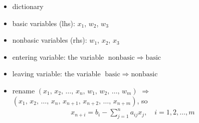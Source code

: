 \documentclass[usenames,dvipsnames,8pt]{beamer}%
\begin{document}
\begin{frame}
\begin{columns}
\begin{column}{0.5\textwidth}
\begin{itemize}
        \item dictionary
        \item basic variables (lhs): $x_1$, $w_2$, $w_3$ 
        \item nonbasic variables (rhs): $w_1$, $x_2$, $x_3$
        \item entering variable: the variable $\text{nonbasic}\;\Longrightarrow\;\text{basic}$
        \item leaving variable: the variable $\text{basic}\;\Longrightarrow\;\text{nonbasic}$
        \item rename $(x_1,\,x_2,\,\ldots,\,x_n,\,w_1,\,w_2,\,\ldots,\,w_m)$ $\Longrightarrow$ $(x_1,\,x_2,\,\ldots,\,x_n,\,x_{n+1},\,x_{n+2},\,\ldots,\,x_{n+m})$, so 
          \begin{align*}
            x_{n+i} = b_i - \sum_{j=1}^n a_{ij}x_j,\quad i = 1, 2, \ldots, m
          \end{align*}
      \end{itemize}
    \end{column}
  \end{columns}
\end{frame}
\end{document}
